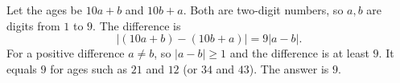 Let the ages be $10a+b$ and $10b+a$. Both are two-digit numbers, so $a,b$ are digits from $1$ to $9$. The difference is
\[
|(10a+b)-(10b+a)|=9|a-b| .
\]
For a positive difference $a\ne b$, so $|a-b|\ge1$ and the difference is at least $9$. It equals $9$ for ages such as $21$ and $12$ (or $34$ and $43$). The answer is $\boxed{9}$.
